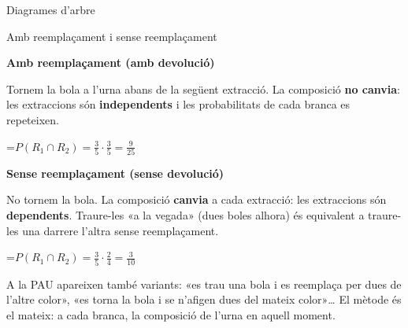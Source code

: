 \documentclass[11pt,a4paper]{article}
\newcommand{\fmm}[1]{\setbox0=\hbox{$#1$}\ifdim\wd0>\linewidth\fmdisp{#1}\else\mbox{\box0}\fi}
\newcommand{\fmdisp}[1]{\[\setbox2=\hbox{$\displaystyle #1$}\ifdim\wd2>\linewidth\resizebox{\linewidth}{!}{\box2}\else\box2\fi\]}
\begin{document}
\begin{fmdef}{Diagrames d'arbre}
\end{fmdef}

\begin{fmdef}{Amb reemplaçament i sense reemplaçament}
\par\noindent \begin{minipage}[t]{0.488\linewidth}\vspace{0pt}\begin{tcolorbox}[enhanced,colback=fmsurface,colframe=fmmuted!35,arc=2.5mm,boxrule=0.6pt,left=2.5mm,right=2.5mm,top=1.5mm,bottom=1.5mm,before upper=\raggedright,equal height group=cmp2]{\color{fmnavy}\bfseries Amb reemplaçament (amb devolució)}\par

Tornem la bola a l'urna abans de la següent extracció. La composició \textbf{no canvia}: les extraccions són \textbf{independents} i les probabilitats de cada branca es repeteixen.

\fmm{P(R_1\cap R_2)=\frac35\cdot\frac35=\frac{9}{25}}\end{tcolorbox}\end{minipage}\hfill\begin{minipage}[t]{0.488\linewidth}\vspace{0pt}\begin{tcolorbox}[enhanced,colback=fmsurface,colframe=fmmuted!35,arc=2.5mm,boxrule=0.6pt,left=2.5mm,right=2.5mm,top=1.5mm,bottom=1.5mm,before upper=\raggedright,equal height group=cmp2]{\color{fmnavy}\bfseries Sense reemplaçament (sense devolució)}\par

No tornem la bola. La composició \textbf{canvia} a cada extracció: les extraccions són \textbf{dependents}. Traure-les «a la vegada» (dues boles alhora) és equivalent a traure-les una darrere l'altra sense reemplaçament.

\fmm{P(R_1\cap R_2)=\frac35\cdot\frac24=\frac{3}{10}}\end{tcolorbox}\end{minipage}\par\medskip

\begin{fmnote}A la PAU apareixen també variants: «es trau una bola i es reemplaça per dues de l'altre color», «es torna la bola i se n'afigen dues del mateix color»\dots{} El mètode és el mateix: a cada branca, la composició de l'urna en aquell moment.\end{fmnote}
\end{fmdef}
\end{document}
